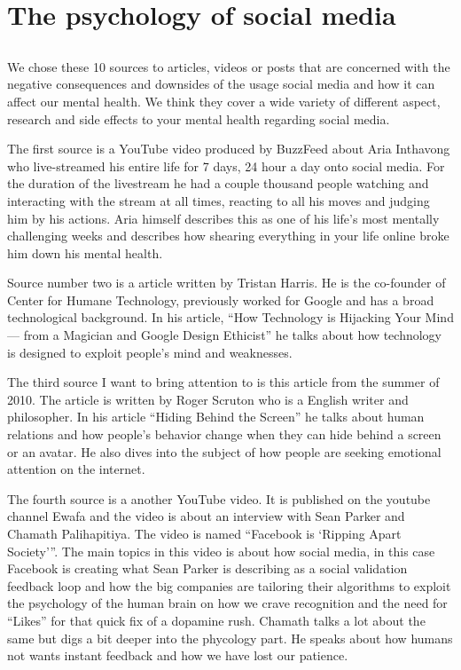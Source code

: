 \documentclass[11pt]{article}
\begin{document}
\section{The psychology of social media}

\subsection{}

We chose these 10 sources to articles, videos or posts that are concerned with the
negative consequences and downsides of the usage social media and how it can affect
our mental health. We think they cover a wide variety of different aspect, research
and side effects to your mental health regarding social media.

The first source \cite{youtube1} is a YouTube video produced by BuzzFeed about Aria
Inthavong who live-streamed his entire life for 7 days, 24 hour a day onto social media.
For the duration of the livestream he had a couple thousand people watching and interacting
with the stream at all times, reacting to all his moves and judging him by his actions.
Aria himself describes this as one of his life's most mentally challenging weeks and
describes how shearing everything in your life online broke him down his mental health.

Source number two \cite{medium} is a article written by Tristan Harris. He is the
co-founder of Center for Humane Technology, previously worked for Google and has a
broad technological background. In his article, “How Technology is Hijacking Your Mind
— from a Magician and Google Design Ethicist” he talks about how technology is designed
to exploit people's mind and weaknesses.

The third source \cite{thenewatlantis} I want to bring attention to is this article
from the summer of 2010. The article is written by Roger Scruton who is a English
writer and philosopher. In his article “Hiding Behind the Screen” he talks about
human relations and how people's behavior change when they can hide behind a screen
or an avatar. He also dives into the subject of how people are seeking emotional
attention on the internet.

The fourth source \cite{youtube2} is a another YouTube video. It is published on
the youtube channel Ewafa and the video is about an interview with Sean Parker and
Chamath Palihapitiya. The video is named “Facebook is ‘Ripping Apart Society’”. The
main topics in this video is about how social media, in this case Facebook is creating
what Sean Parker is describing as a social validation feedback loop and how the big
companies are tailoring their algorithms to exploit the psychology of the human brain
on how we crave recognition and the need for “Likes” for that quick fix of a dopamine
rush. Chamath talks a lot about the same but digs a bit deeper into the phycology part.
He speaks about how humans not wants instant feedback and how we have lost our patience.
\end{document}
